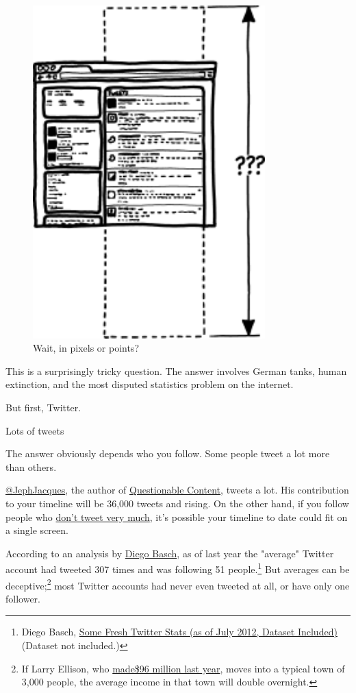 {\begin{figure}[!htbp]
\centering
\includegraphics[scale=0.5, max width=0.8\textwidth]{imgs/a/65/timeline_intro.png}
\caption{Wait, in pixels or points?}
\end{figure}

{This is a surprisingly tricky question. The answer involves German tanks, human extinction, and the most disputed statistics problem on the internet.}

{But first, Twitter.}

{Lots of tweets}

{The answer obviously depends who you follow. Some people tweet a lot more than others.}

{ \href{http://twitter.com/jephjacques}{@JephJacques}, the author of \href{http://questionablecontent.net/}{Questionable Content}, tweets a lot. His contribution to your timeline will be 36,000 tweets and rising. On the other hand, if you follow people who \href{http://twitter.com/xkcd} {don't tweet very much}, it's possible your timeline to date could fit on a single screen.}

{According to an analysis by \href{https://twitter.com/dbasch}{Diego Basch}, as of last year the "average" Twitter account had tweeted 307 times and was following 51 people.{\footnote{Diego Basch, \href{http://diegobasch.com/some-fresh-twitter-stats-as-of-july-2012}{Some Fresh Twitter Stats (as of July 2012, Dataset Included)}(Dataset not included.)} } But averages can be deceptive;{\footnote{If Larry Ellison, who \href{http://www.sec.gov/Archives/edgar/data/1341439/000119312512399999/d399484ddef14a.htm\#toc399484\_27} {made\$96 million last year}, moves into a typical town of 3,000 people, the average income in that town will double overnight.} } most Twitter accounts had never even tweeted at all, or have only one follower.}

}
